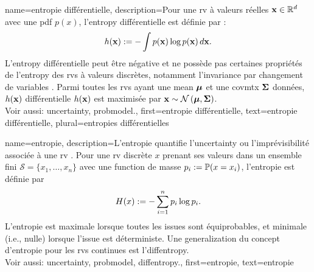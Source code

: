 {name={entropie différentielle},
	description={Pour une \gls{rv} à valeurs réelles ${\bf x} \in \mathbb{R}^{d}$ 
		avec une \gls{pdf} $p(x)$, l’\gls{entropy} différentielle est définie par \cite{coverthomas}:
		\[
		h({\bf x}) := - \int p({\bf x}) \log p({\bf x}) \, d{\bf x}.
		\]
		L’\gls{entropy} différentielle peut être négative et ne possède pas certaines propriétés 
		de l’\gls{entropy} des \glspl{rv} à valeurs discrètes, notamment l’invariance par changement de variables \cite{coverthomas}. 
		Parmi toutes les \glspl{rv} ayant une \gls{mean} ${\bm \mu}$ et une \gls{covmtx} ${\bf \Sigma}$ données, 
	$h({\bf x})$ différentielle $h({\bf x})$ est maximisée par ${\bf x} \sim \mathcal{N}\left({\bm \mu},{\bf \Sigma}\right)$. 
		\\
		Voir aussi: \gls{uncertainty}, \gls{probmodel}.},
	first={entropie différentielle},
	text={entropie différentielle}, plural={entropies différentielles}
}

{name={entropie},
	description={L’entropie quantifie l’\gls{uncertainty} ou l’imprévisibilité associée à une \gls{rv} \cite{coverthomas}. 
		Pour une \gls{rv} discrète $x$ prenant ses valeurs dans un ensemble fini $\mathcal{S} = \{x_1, \ldots, x_n\}$ avec 
		une \gls{function} de masse $p_i := \mathbb{P}({x = x_i})$, l’entropie est définie par
		\[
		H(x) := -\sum_{i=1}^n p_i \log p_i.
		\]
		L’entropie est maximale lorsque toutes les issues sont équiprobables, et minimale (i.e., nulle) 
		lorsque l’issue est déterministe. Une \gls{generalization} du concept d’entropie pour les \glspl{rv} continues est l’\gls{diffentropy}. 
		\\
		Voir aussi: \gls{uncertainty}, \gls{probmodel}, \gls{diffentropy}.},
	first={entropie},
	text={entropie}
}


